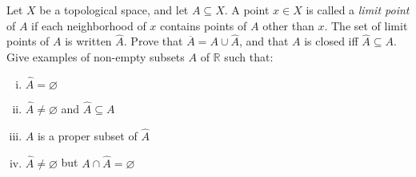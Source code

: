 \documentclass[12pt]{article}
\newenvironment{problem}[2][Problem]{\begin{trivlist}
\item[\hskip \labelsep {\bfseries #1}\hskip \labelsep {\bfseries #2.}]}{\end{trivlist}}
\begin{document}
\begin{problem}{3}
  Let $X$ be a topological space, and let $A\subseteq X$.
  A point $x\in X$ is called a \textit{limit point} of $A$ if each neighborhood of $x$ contains
  points of $A$ other than $x$.
  The set of limit points of $A$ is written $\widehat{A}$.
  Prove that $\overline{A} = A\cup\widehat{A}$, and that $A$ is closed iff $\widehat{A}\subseteq A$.
  Give examples of non-empty subsets $A$ of $\mathbb{R}$ such that:
  \begin{enumerate}[(i)]
    \item $\widehat{A} = \varnothing$
    \item $\widehat{A}\neq\varnothing$ and $\widehat{A}\subseteq A$
    \item $A$ is a proper subset of $\widehat{A}$
    \item $\widehat{A}\neq\varnothing$ but $A\cap\widehat{A}=\varnothing$
  \end{enumerate}
\end{problem}
\end{document}

